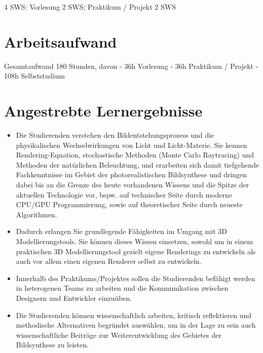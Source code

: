 4 SWS: Vorlesung 2 SWS; Praktikum / Projekt 2 SWS

\section*{Arbeitsaufwand
\label{/mi-2017/modulbeschreibungen-master/MA_VC_Modul_PhotorealistischeBildsynthese}}\label{arbeitsaufwand-pathlabelmi-2017modulbeschreibungen-mastermaux5fvcux5fmodulux5fphotorealistischebildsynthese}

Gesamtaufwand 180 Stunden, davon - 36h Vorlesung - 36h Praktikum /
Projekt - 108h Selbststudium

\section*{Angestrebte
Lernergebnisse\label{/mi-2017/modulbeschreibungen-master/MA_VC_Modul_PhotorealistischeBildsynthese}}\label{angestrebte-lernergebnissepathlabelmi-2017modulbeschreibungen-mastermaux5fvcux5fmodulux5fphotorealistischebildsynthese}

\begin{itemize}
\tightlist
\item
  Die Studierenden verstehen den Bildentstehungsprozess und die
  physikalischen Wechselwirkungen von Licht und Licht-Materie. Sie
  kennen Rendering-Equation, stochastische Methoden (Monte Carlo
  Raytracing) und Methoden der natürlichen Beleuchtung, und erarbeiten
  sich damit tiefgehende Fachkenntnisse im Gebiet der photorealistischen
  Bildsynthese und dringen dabei bis an die Grenze des heute vorhandenen
  Wissens und die Spitze der aktuellen Technologie vor, bspw. auf
  technischer Seite durch moderne CPU/GPU Programmierung, sowie auf
  theoretischer Seite durch neueste Algorithmen.
\item
  Dadurch erlangen Sie grundlegende Fähigkeiten im Umgang mit 3D
  Modellierungstools. Sie können dieses Wissen einsetzen, sowohl um in
  einem praktischen 3D Modellierungstool gezielt eigene Renderings zu
  entwickeln als auch vor allem einen eigenen Renderer selbst zu
  entwickeln.
\item
  Innerhalb des Praktikums/Projektes sollen die Studierenden befähigt
  werden in heterogenen Teams zu arbeiten und die Kommunikation zwischen
  Designern und Entwickler einzuüben.
\item
  Die Studierenden können wissenschaftlich arbeiten, kritisch
  reflektieren und methodische Alternativen begründet auswählen, um in
  der Lage zu sein auch wissenschaftliche Beiträge zur Weiterentwicklung
  des Gebietes der Bildsynthese zu leisten.
\end{itemize}

